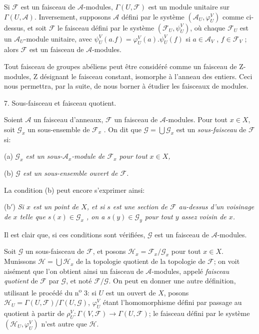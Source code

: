 Si $\mathcal{F}$ est un faisceau de $\mathcal{A}$-modules, $\Gamma(U, \mathcal{F})$ est un module unitaire sur $\Gamma(U, \mathcal{A})$. Inversement, supposons $\mathcal{A}$ défini par le système $(\mathcal{A}_U , \varphi_U^V)$ comme ci-dessus, et soit $\mathcal{F}$ le faisceau défini par le système $(\mathcal{F}_U , \psi_U^V)$, où chaque $\mathcal{F}_U$ est un $\mathcal{A}_U$-module unitaire, avec $\psi_U^V(a.f) = \varphi_U^V(a).\psi_U^V(f)$ si $a \in \mathcal{A}_V$ , $f \in \mathcal{F}_V$ ; alors $\mathcal{F}$ est un faisceau de $\mathcal{A}$-modules.

Tout faisceau de groupes abéliens peut être considéré comme un faisceau de $\mathrm{Z}$-modules, $\mathrm{Z}$ désignant le faisceau constant, isomorphe à l'anneau des entiers. Ceci nous permettra, par la suite, de nous borner à étudier les faisceaux de modules.


7. Sous-faisceau et faisceau quotient.

Soient $\mathcal{A}$ un faisceau d'anneaux, $\mathcal{F}$ un faisceau de $\mathcal{A}$-modules. Pour tout $x \in X$, soit $\mathcal{G}_x$ un sous-ensemble de $\mathcal{F}_x$ . On dit que $\mathcal{G} = \bigcup \mathcal{G}_x$ est un \emph{sous-faisceau} de $\mathcal{F}$ si:

(a) \emph{$\mathcal{G}_x$ est un sous-$\mathcal{A}_x$-module de $\mathcal{F}_x$ pour tout $x \in X$,}

(b) \emph{$\mathcal{G}$ est un sous-ensemble ouvert de $\mathcal{F}$.}

La condition (b) peut encore s'exprimer ainsi:

(b$'$) \emph{Si $x$ est un point de $X$, et si $s$ est une section de $\mathcal{F}$ au-dessus d'un voisinage de $x$ telle que $s(x) \in \mathcal{G}_x$ , on a $s(y) \in \mathcal{G}_y$ pour tout $y$ assez voisin de $x$.}

Il est clair que, si ces conditions sont vérifiées, $\mathcal{G}$ est un faisceau de $\mathcal{A}$-modules.

Soit $\mathcal{G}$ un sous-faisceau de $\mathcal{F}$, et posons $\mathcal{H}_x = \mathcal{F}_x/\mathcal{G}_x$ pour tout $x \in X$. Munissons $\mathcal{H} = \bigcup \mathcal{H}_x$ de la topologie quotient de la topologie de $\mathcal{F}$; on voit aisément que l'on obtient ainsi un faisceau de $\mathcal{A}$-modules, appelé \emph{faisceau quotient} de $\mathcal{F}$ par $\mathcal{G}$, et noté $\mathcal{F}/\mathcal{G}$. On peut en donner une autre définition, utilisant le procédé du n\textsuperscript{o} 3:
si $U$ est un ouvert de $X$, posons $\mathcal{H}_U = \Gamma(U, \mathcal{F})/\Gamma(U, \mathcal{G})$, $\varphi_U^V$ étant l'homomorphisme défini par passage au quotient à partir de $\rho_U^V : \Gamma(V, \mathcal{F}) \to \Gamma(U, \mathcal{F})$; le faisceau défini par le système $(\mathcal{H}_U , \varphi_U^V)$ n'est autre que $\mathcal{H}$.

